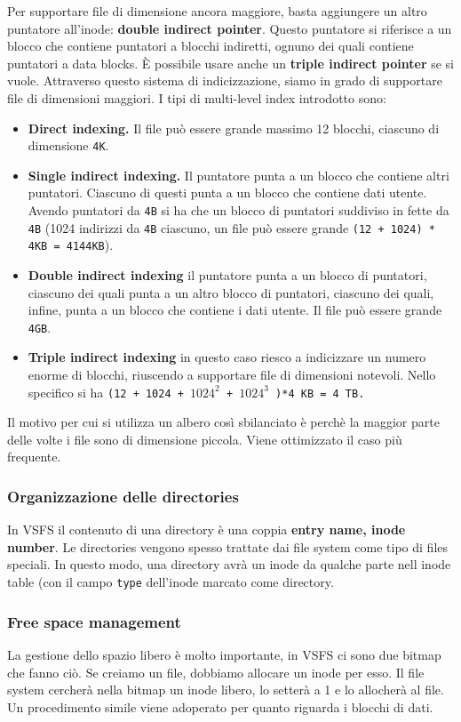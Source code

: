 \documentclass[12pt, twoside, letterpaper]{article}
\begin{document}
				Per supportare file di dimensione ancora maggiore, basta aggiungere un altro puntatore all'inode: \textbf{double indirect pointer}. Questo puntatore si riferisce a un blocco che contiene puntatori a blocchi indiretti, ognuno dei quali contiene puntatori a data blocks. È possibile usare anche un \textbf{triple indirect pointer} se si vuole. Attraverso questo sistema di indicizzazione, siamo in grado di supportare file di dimensioni maggiori. I tipi di multi-level index introdotto sono:
				\begin{itemize}
					\item \textbf{Direct indexing.} Il file può essere grande massimo 12 blocchi, ciascuno di dimensione \texttt{4K}.
					\item \textbf{Single indirect indexing.} Il puntatore punta a un blocco che contiene altri puntatori. Ciascuno di questi punta a un blocco che contiene dati utente. Avendo puntatori da \texttt{4B} si ha che un blocco di puntatori suddiviso in fette da \texttt{4B} (1024 indirizzi da \texttt{4B} ciascuno, un file può essere grande \texttt{(12 + 1024) * 4KB = 4144KB}).
					\item \textbf{Double indirect indexing} il puntatore punta a un blocco di puntatori, ciascuno dei quali punta a un altro blocco di puntatori, ciascuno dei quali, infine, punta a un blocco che contiene i dati utente. Il file può essere grande \texttt{4GB}.
					\item \textbf{Triple indirect indexing} in questo caso riesco a indicizzare un numero enorme di blocchi, riuscendo a supportare file di dimensioni notevoli. Nello specifico si ha \texttt{(12 + 1024 + $1024^2$ + $1024^3$ )*4 KB = 4 TB.}
				\end{itemize}
				Il motivo per cui si utilizza un albero così sbilanciato è perchè la maggior parte delle volte i file sono di dimensione piccola. Viene ottimizzato il caso più frequente.
			
			\subsubsection{Organizzazione delle directories}
				In VSFS il contenuto di una directory è una coppia \textbf{entry name, inode number}. Le directories vengono spesso trattate dai file system come tipo di files speciali. In questo modo, una directory avrà un inode da qualche parte nell inode table (con il campo \texttt{type} dell'inode marcato come directory.
				
			\subsubsection{Free space management}
				La gestione dello spazio libero è molto importante, in VSFS ci sono due bitmap che fanno ciò.
				Se creiamo un file, dobbiamo allocare un inode per esso. Il file system cercherà nella bitmap un inode libero, lo setterà a 1 e lo allocherà al file. Un procedimento simile viene adoperato per quanto riguarda i blocchi di dati.
				
\end{document}
